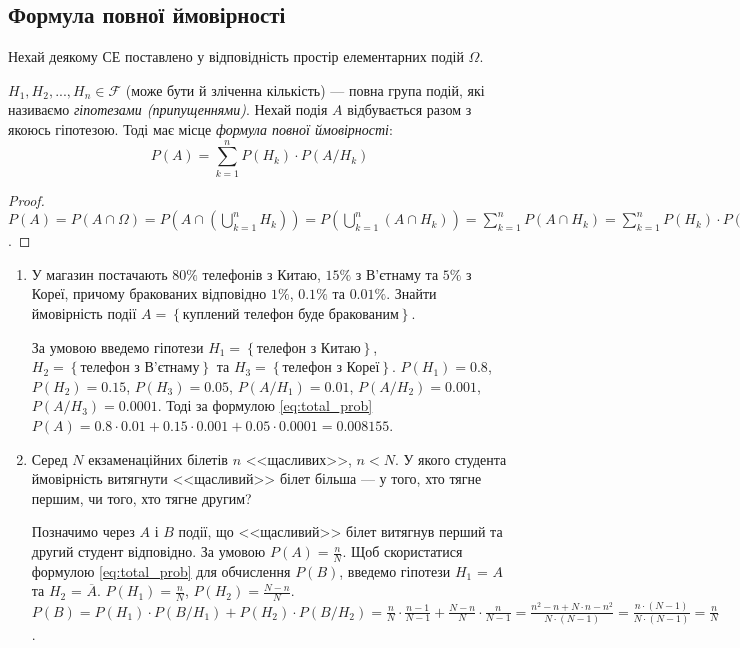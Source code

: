 \subsection{Формула повної ймовірності}
Нехай деякому СЕ поставлено у відповідність простір елементарних подій $\Omega$.

$H_1, H_2, ..., H_n \in \mathcal{F}$ (може бути й зліченна кількість) --- повна група подій,
які називаємо \emph{гіпотезами (припущеннями)}.
Нехай подія $A$ відбувається разом з якоюсь гіпотезою. Тоді має місце
\emph{формула повної ймовірності}:
\begin{equation}\label{eq:total_prob}
    P\left( A \right) = \sum\limits_{k=1}^n P(H_k)\cdot P(A/H_k)
\end{equation}
\begin{proof}
    $P(A) = P(A \cap \Omega) = P\left(A \cap \left(\bigcup\limits_{k=1}^n H_k\right)\right) = P\left(\bigcup\limits_{k=1}^n (A\cap H_k)\right) = \sum\limits_{k=1}^n P(A\cap H_k) = \sum\limits_{k=1}^n P(H_k)\cdot P(A/H_k)$.
\end{proof}

\begin{example}
    \begin{enumerate}
        \item У магазин постачають $80\%$ телефонів з Китаю, $15\%$ з В'єтнаму та $5\%$ з Кореї,
        причому бракованих відповідно $1\%$, $0.1\%$ та $0.01\%$.
        Знайти ймовірність події $A = \left\{ \text{куплений телефон буде бракованим}\right\}$.

        За умовою введемо гіпотези $H_1 = \left\{ \text{телефон з Китаю}\right\}$,
        $H_2 = \left\{ \text{телефон з В'єтнаму}\right\}$ та $H_3 = \left\{ \text{телефон з Кореї}\right\}$.
        $P(H_1) = 0.8$, $P(H_2) = 0.15$, $P(H_3) = 0.05$,
        $P(A/H_1) = 0.01$, $P(A/H_2) = 0.001$, $P(A/H_3) = 0.0001$.
        Тоді за формулою \eqref{eq:total_prob} $P(A) = 0.8\cdot 0.01 + 0.15\cdot 0.001 + 0.05\cdot 0.0001 = 0.008155$.
        \item Серед $N$ екзаменаційних білетів $n$ <<щасливих>>, $n<N$.
        У якого студента ймовірність витягнути <<щасливий>> білет більша --- у того, хто тягне першим, чи того, хто тягне другим?

        Позначимо через $A$ і $B$ події, що <<щасливий>> білет витягнув перший та другий студент відповідно. За умовою $P(A) = \frac{n}{N}$.
        Щоб скористатися формулою \eqref{eq:total_prob} для обчислення $P(B)$, введемо гіпотези $H_1$ = $A$ та $H_2$ = $\overline{A}$.
        $P(H_1) = \frac{n}{N}$, $P(H_2) = \frac{N-n}{N}$.
        \\ $P(B) = P(H_1)\cdot P(B/H_1) + P(H_2)\cdot P(B/H_2) = \frac{n}{N}\cdot \frac{n-1}{N-1} + \frac{N-n}{N}\cdot \frac{n}{N-1} = 
        \frac{n^2 - n + N\cdot n - n^2}{N\cdot(N-1)} = \frac{n\cdot (N-1)}{N\cdot(N-1)} = \frac{n}{N}$.
    \end{enumerate}
\end{example}

